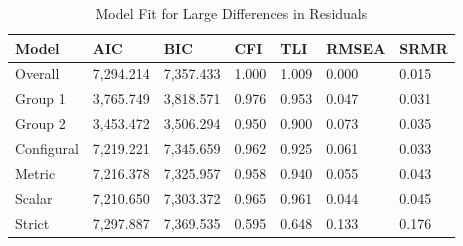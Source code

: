 \documentclass[
  man]{apa7}
\begin{document}
\begin{table}[tbp]

\begin{center}
\begin{threeparttable}

\caption{\label{tab:tab10}Model Fit for Large Differences in Residuals}

\begin{tabular}{lllllll}
\toprule
Model & AIC & BIC & CFI & TLI & RMSEA & SRMR\\
\midrule
Overall & 7,294.214 & 7,357.433 & 1.000 & 1.009 & 0.000 & 0.015\\
Group 1 & 3,765.749 & 3,818.571 & 0.976 & 0.953 & 0.047 & 0.031\\
Group 2 & 3,453.472 & 3,506.294 & 0.950 & 0.900 & 0.073 & 0.035\\
Configural & 7,219.221 & 7,345.659 & 0.962 & 0.925 & 0.061 & 0.033\\
Metric & 7,216.378 & 7,325.957 & 0.958 & 0.940 & 0.055 & 0.043\\
Scalar & 7,210.650 & 7,303.372 & 0.965 & 0.961 & 0.044 & 0.045\\
Strict & 7,297.887 & 7,369.535 & 0.595 & 0.648 & 0.133 & 0.176\\
\bottomrule
\end{tabular}

\end{threeparttable}
\end{center}

\end{table}
\end{document}
